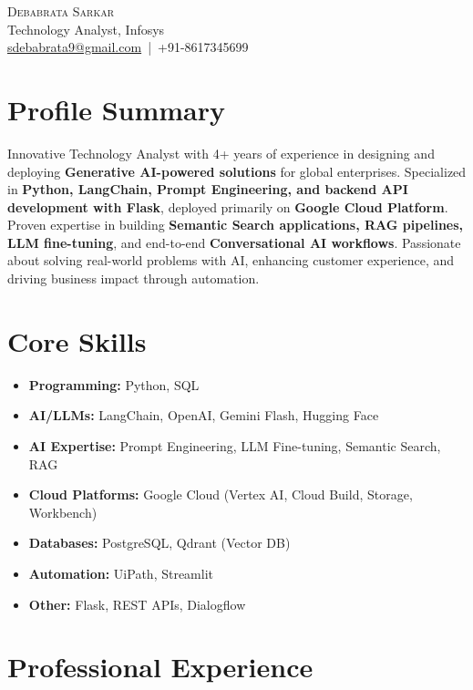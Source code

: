 \documentclass[a4paper,11pt]{article}
\begin{document}
\begin{center}
    {\Huge \scshape Debabrata Sarkar} \\[6pt]
    Technology Analyst, Infosys \\
    \href{mailto:debabrata.sarkar@infosys.com}{sdebabrata9@gmail.com} \,|\, 
    +91-8617345699 \\
\end{center}

\section*{Profile Summary}
Innovative Technology Analyst with 4+ years of experience in designing and deploying \textbf{Generative AI-powered solutions} for global enterprises. Specialized in \textbf{Python, LangChain, Prompt Engineering, and backend API development with Flask}, deployed primarily on \textbf{Google Cloud Platform}.  
Proven expertise in building \textbf{Semantic Search applications, RAG pipelines, LLM fine-tuning}, and end-to-end \textbf{Conversational AI workflows}. Passionate about solving real-world problems with AI, enhancing customer experience, and driving business impact through automation.

\section*{Core Skills}
\begin{itemize}
    \item \textbf{Programming:} Python, SQL
    \item \textbf{AI/LLMs:} LangChain, OpenAI, Gemini Flash, Hugging Face
    \item \textbf{AI Expertise:} Prompt Engineering, LLM Fine-tuning, Semantic Search, RAG
    \item \textbf{Cloud Platforms:} Google Cloud (Vertex AI, Cloud Build, Storage, Workbench)
    \item \textbf{Databases:} PostgreSQL, Qdrant (Vector DB)
    \item \textbf{Automation:} UiPath, Streamlit
    \item \textbf{Other:} Flask, REST APIs, Dialogflow
\end{itemize}

\section*{Professional Experience}
\end{document}
